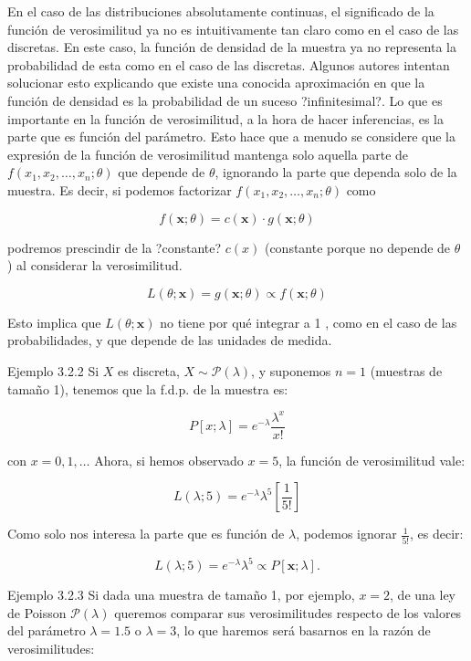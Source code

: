 \documentclass[
]{article}
\begin{document}
En el caso de las distribuciones absolutamente continuas, el significado de la función de verosimilitud ya no es intuitivamente tan claro como en el caso de las discretas. En este caso, la función de densidad de la muestra ya no representa la probabilidad de esta como en el caso de las discretas. Algunos autores intentan solucionar esto explicando que existe una conocida aproximación en que la función de densidad es la probabilidad de un suceso ?infinitesimal?.
Lo que es importante en la función de verosimilitud, a la hora de hacer inferencias, es la parte que es función del parámetro. Esto hace que a menudo se considere que la expresión de la función de verosimilitud mantenga solo aquella parte de \(f\left(x_{1}, x_{2}, \ldots, x_{n} ; \theta\right)\) que depende de \(\theta\), ignorando la parte que dependa solo de la muestra. Es decir, si podemos factorizar \(f\left(x_{1}, x_{2}, \ldots, x_{n} ; \theta\right)\) como

\[
f(\mathbf{x} ; \theta)=c(\mathbf{x}) \cdot g(\mathbf{x} ; \theta)
\]

podremos prescindir de la ?constante? \(c(x)\) (constante porque no depende de \(\theta\) ) al considerar la verosimilitud.

\[
L(\theta ; \mathbf{x})=g(\mathbf{x} ; \theta) \propto f(\mathbf{x} ; \theta)
\]

Esto implica que \(L(\theta ; \mathbf{x})\) no tiene por qué integrar a 1 , como en el caso de las probabilidades, y que depende de las unidades de medida.

Ejemplo 3.2.2 Si \(X\) es discreta, \(X \sim \mathcal{P}(\lambda)\), y suponemos \(n=1\) (muestras de tamaño 1), tenemos que la f.d.p. de la muestra es:

\[
P[x ; \lambda]=e^{-\lambda} \frac{\lambda^{x}}{x!}
\]

con \(x=0,1, \ldots\) Ahora, si hemos observado \(x=5\), la función de verosimilitud vale:

\[
L(\lambda ; 5)=e^{-\lambda} \lambda^{5}\left[\frac{1}{5!}\right]
\]

Como solo nos interesa la parte que es función de \(\lambda\), podemos ignorar \(\frac{1}{5!}\), es decir:

\[
L(\lambda ; 5)=e^{-\lambda} \lambda^{5} \propto P[\mathbf{x} ; \lambda] .
\]

Ejemplo 3.2.3 Si dada una muestra de tamaño 1, por ejemplo, \(x=2\), de una ley de Poisson \(\mathcal{P}(\lambda)\) queremos comparar sus verosimilitudes respecto de los valores del parámetro \(\lambda=1.5\) o \(\lambda=3\), lo que haremos será basarnos en la razón de verosimilitudes:
\end{document}
